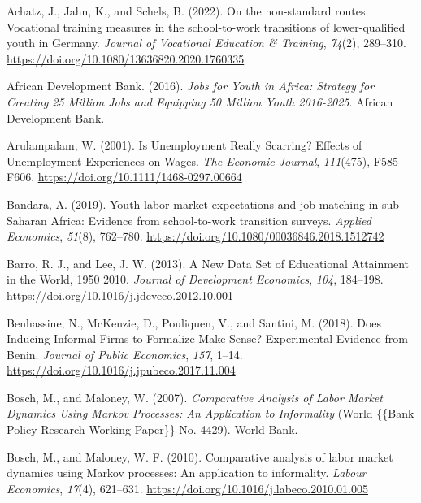 \documentclass[
  11pt,
a4paper
]{article}
\newlength{\cslhangindent}
\newenvironment{CSLReferences}[2] %
 {%
  \setlength{\parindent}{0pt}
  \ifodd #1 \everypar{\setlength{\hangindent}{\cslhangindent}}\ignorespaces\fi
  \ifnum #2 > 0
  \setlength{\parskip}{#2\baselineskip}
  \fi
 }%
 {}
\begin{document}
\hypertarget{refs}{}
\begin{CSLReferences}{1}{0}
\leavevmode{}%
Achatz, J., Jahn, K., and Schels, B. (2022). On the non-standard routes: Vocational training measures in the school-to-work transitions of lower-qualified youth in {Germany}. \emph{Journal of Vocational Education \& Training}, \emph{74}(2), 289--310. \url{https://doi.org/10.1080/13636820.2020.1760335}

\leavevmode{}%
African Development Bank. (2016). \emph{Jobs for {Youth} in {Africa}: {Strategy} for {Creating} 25 {Million Jobs} and {Equipping} 50 {Million Youth} 2016-2025}. {African Development Bank}.

\leavevmode{}%
Arulampalam, W. (2001). Is {Unemployment Really Scarring}? {Effects} of {Unemployment Experiences} on {Wages}. \emph{The Economic Journal}, \emph{111}(475), F585--F606. \url{https://doi.org/10.1111/1468-0297.00664}

\leavevmode{}%
Bandara, A. (2019). Youth labor market expectations and job matching in sub-{Saharan Africa}: Evidence from school-to-work transition surveys. \emph{Applied Economics}, \emph{51}(8), 762--780. \url{https://doi.org/10.1080/00036846.2018.1512742}

\leavevmode{}%
Barro, R. J., and Lee, J. W. (2013). A {New Data Set} of {Educational Attainment} in the {World}, 1950\textendash{} 2010. \emph{Journal of Development Economics}, \emph{104}, 184--198. \url{https://doi.org/10.1016/j.jdeveco.2012.10.001}

\leavevmode{}%
Benhassine, N., McKenzie, D., Pouliquen, V., and Santini, M. (2018). Does {Inducing Informal Firms} to {Formalize Make Sense}? {Experimental Evidence} from {Benin}. \emph{Journal of Public Economics}, \emph{157}, 1--14. \url{https://doi.org/10.1016/j.jpubeco.2017.11.004}

\leavevmode{}%
Bosch, M., and Maloney, W. (2007). \emph{Comparative {Analysis} of {Labor Market Dynamics Using Markov Processes}: {An Application} to {Informality}} (World \{\{Bank Policy Research Working Paper\}\} No. 4429). {World Bank}.

\leavevmode{}%
Bosch, M., and Maloney, W. F. (2010). Comparative analysis of labor market dynamics using {Markov} processes: {An} application to informality. \emph{Labour Economics}, \emph{17}(4), 621--631. \url{https://doi.org/10.1016/j.labeco.2010.01.005}


\end{CSLReferences}
\end{document}
